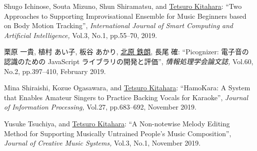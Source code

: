 \begin{Enumerate}
\item 
Shugo Ichinose, 
Souta Mizuno, 
Shun Shiramatsu, 
and 
\underline{Tetsuro Kitahara}: 
    ``Two Approaches to Supporting Improvisational Ensemble
for Music Beginners based on Body Motion Tracking'', 
    {\it International Journal of Smart Computing and Artificial Intelligence,
    } Vol.3, No.1, pp.55--70, 2019. 

\item 
栗原 一貴, 
植村 あい子, 
板谷 あかり, 
\underline{北原 鉄朗}, 
長尾 確: 
    ``Picognizer: 電子音の認識のための JavaScript ライブラリの開発と評価'', 
    {\it 情報処理学会論文誌,
    } Vol.60, No.2, pp.397--410, February 2019. 

\item 
Mina Shiraishi, 
Kozue Ogasawara, 
and 
\underline{Tetsuro Kitahara}: 
    ``HamoKara: A System that Enables Amateur Singers to Practice Backing Vocals for Karaoke'', 
    {\it Journal of Information Processing,
    } Vol.27, pp.683--692, November 2019. 

\item 
Yusuke Tsuchiya, 
and 
\underline{Tetsuro Kitahara}: 
    ``A Non-notewise Melody Editing Method for Supporting Musically Untrained People's Music Composition'', 
    {\it Journal of Creative Music Systems,
    } Vol.3, No.1, November 2019. 

\end{Enumerate}

